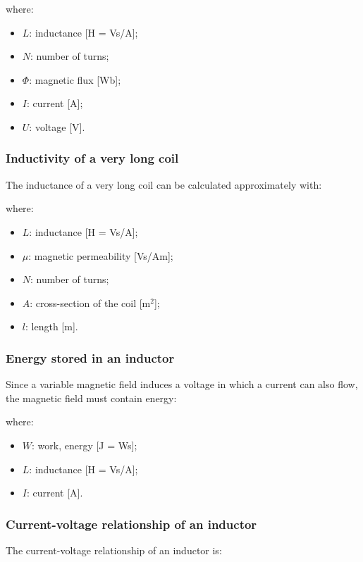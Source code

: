 \documentclass{article}
\begin{document}

where:
\begin{itemize}
    \item $L$: inductance [H = Vs/A];
    \item $N$: number of turns;
    \item $\Phi$: magnetic flux [Wb];
    \item $I$: current [A];
    \item $U$: voltage [V].
\end{itemize}

\subsubsection{Inductivity of a very long coil}
The inductance of a very long coil can be calculated approximately with:

where:
\begin{itemize}
    \item $L$: inductance [H = Vs/A];
    \item $\mu$: magnetic permeability [Vs/Am];
    \item $N$: number of turns;
    \item $A$: cross-section of the coil [m$^2$];
    \item $l$: length [m].
\end{itemize}

\subsubsection{Energy stored in an inductor}
Since a variable magnetic field induces a voltage in which a current can also flow, the magnetic field must contain
energy:


where:
\begin{itemize}
    \item $W$: work, energy [J = Ws];
    \item $L$: inductance [H = Vs/A];
    \item $I$: current [A].
\end{itemize}

\newpage
\subsubsection{Current-voltage relationship of an inductor}
The current-voltage relationship of an inductor is:
\end{document}
